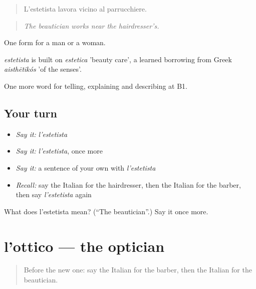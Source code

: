 \begin{quote}
L'estetista lavora vicino al parrucchiere.
\end{quote}

\begin{quote}
\emph{The beautician works near the hairdresser's.}
\end{quote}

One form for a man or a woman.

\begin{cousinweb}
\emph{estetista} is built on \emph{estetica} 'beauty care', a learned borrowing from Greek \emph{aisthētikós} 'of the senses'.
\end{cousinweb}

\begin{grammarlens}[title={What you've built}]
One more word for telling, explaining and describing at B1.
\end{grammarlens}

\subsection*{Your turn}
\begin{itemize}
\raggedright
  \item \emph{Say it:} \emph{l'estetista}
  \item \emph{Say it:} \emph{l'estetista}, once more
  \item \emph{Say it:} a sentence of your own with \emph{l'estetista}
  \item \emph{Recall:} say the Italian for the hairdresser, then the Italian for the barber, then say \emph{l'estetista} again
\end{itemize}

\begin{tcolorbox}[breakable,colback=teal!4,colframe=teal!35!black,title={Before you move on}]
What does l'estetista mean? (\textquotedblleft{}The beautician\textquotedblright{}.) Say it once more.
\end{tcolorbox}
\section[l'ottico]{l'ottico — the optician}

\label{lesson:IT-C456-ottico}



\begin{quote}
Before the new one: say the Italian for the barber, then the Italian for the beautician.
\end{quote}

